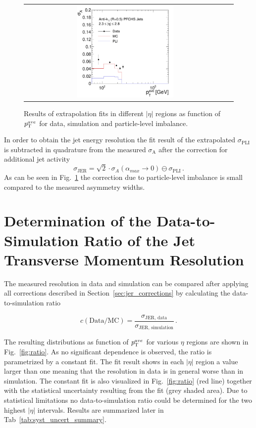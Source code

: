 \begin{figure}[!htp]
\begin{tabular}{cc}
                \includegraphics[width=0.49\textwidth]{figures/Extrapol_Eta4_final_nominal_v4.pdf}
  \end{tabular}
  \caption{Results of extrapolation fits in different $|\eta|$ regions as function of $p_{\text{T}}^{ave}$ for data, simulation and particle-level imbalance.}
  \label{fig:fit-results}
\end{figure}

In order to obtain the jet energy resolution the fit result of the extrapolated $\sigma_\mathrm{PLI}$ is subtracted in quadrature from the measured $\sigma_\mathrm{A}$ after the correction for additional jet activity 
\begin{equation}
\sigma_\mathrm{JER} =  \sqrt{2} \cdot \sigma_{A}(\alpha_{max} \rightarrow 0) \ominus \sigma_\mathrm{PLI} \, .
\end{equation}  
As can be seen in Fig.~\ref{fig:fit-results} the correction due to particle-level imbalance is small compared to the measured asymmetry widths.

\section[Determination of the Data-to-Simulation Ratio]{Determination of the Data-to-Simulation Ratio of the Jet Transverse Momentum Resolution}
\label{sec:jer_ratio_determination}
The measured resolution in data and simulation can be compared after applying all corrections described in Section~\ref{sec:jer_corrections} by calculating the data-to-simulation ratio

\begin{equation}
  c(\mathrm{Data}/\mathrm{MC}) = \frac{ \sigma_\mathrm{JER,\, data}}{ \sigma_\mathrm{JER,\, simulation}} \, .
 \end{equation}

 The resulting distributions as function of $p_{\text{T}}^{ave}$ for various $\eta$ regions are shown in Fig.~\ref{fig:ratio}. As no significant \pt dependence is observed, the ratio is parametrized by a constant fit. The fit result shows in each $|\eta|$ region a value larger than one meaning that the resolution in data is in general worse than in simulation. The constant fit is also visualized in Fig.~\ref{fig:ratio} (red line) together with the statistical uncertainty resulting from the fit (grey shaded area). Due to statistical limitations no data-to-simulation ratio could be determined for the two highest $|\eta|$ intervals. Results are summarized later in Tab~\ref{tab:syst_uncert_summary}. 
 
